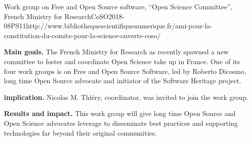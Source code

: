 \begin{event}{Work group on Free and Open Source software, ``Open Science Committee'', French Ministry for Research}{CoSO}{2018-08}{PS}{1}{1}{http://www.bibliothequescientifiquenumerique.fr/ami-pour-la-constitution-du-comite-pour-la-science-ouverte-coso/}

\textbf{Main goals.} The French Ministry for Research as recently
spawned a new committee to foster and coordinate Open Science take up
in France. One of its four work groups is on Free and Open Source
Software, led by Roberto Dicosmo, long time Open Source advocate and
initiator of the Software Heritage project.

\textbf{\ODK implication.} Nicolas M. Thiéry, \ODK coordinator, was
invited to join the work group.

\textbf{Results and impact.} This work group will give long time Open
Source and Open Science advocates leverage to disseminate best
practices and supporting technologies far beyond their original
communities.
\end{event}
